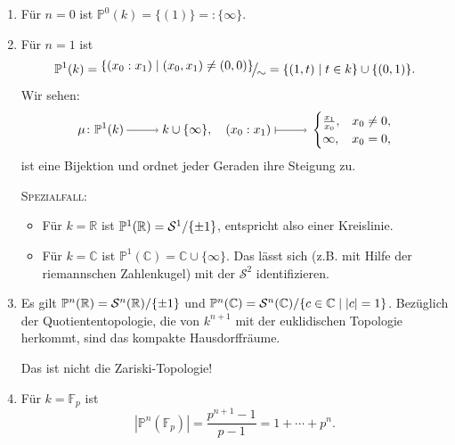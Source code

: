 \documentclass[a4paper,12pt]{scrbook}
\theoremstyle{keinenummern} %
\theoremstyle{mitnummern}
\theoremstyle{unserbeweis}
\def\C{\mathbb{C}}
\def\P{\mathbb{P}}
\def\S{\mathcal{S}}
\newcommand{\FF}{\mathbb{F}}
\newcommand{\card}[1]{|#1|}
\newcommand{\set}[1]{\ensuremath{\mathbb{#1}}}
\newcommand{\R}{\set{R}}
\newcommand{\ra}{\raisebox{-1pt}{\tikz{\draw[thin,shorten >=3pt, ->] (0,0) node{\hspace*{-2pt}} -- node{} (1,0);}}\penalty1000\relax}
\renewcommand{\mapsto}{\raisebox{-1pt}{\tikz{\draw[thin,shorten >=3pt, |->] (0,0) node{\hspace*{0pt}} -- node{} (1,0);}}\penalty1000\relax}
\newcommand{\Quotient}[2]{
  \mathchoice
  { %
    \raisebox{0.7ex}{\ensuremath{#1}}
    \ensuremath{\mkern-3mu}\big/\ensuremath{\mkern-3mu}
    \raisebox{-0.6ex}{\ensuremath{#2}}
  }
  { %
    #1/#2
  }
  { %
    #1/#2
  }
  { %
    #1/#2
  }
}
\begin{document}
\begin{bsp}\label{2.2.2}\begin{enumerate}
\item Für $n=0$ ist $\P^{0}(k) = \{(1)\} =: \{\infty\}$.
\item Für $n=1$ ist \[\P^{1}(k)=\Quotient{\{(x_{0}:x_{1})\mid(x_{0},x_{1})\neq(0,0)\}}{\sim}=\{(1,t)\mid t\in k\}\cup\{(0,1)\}.\] \vspace*{-6pt}Wir sehen:\vspace*{-12pt}
\[\mu\colon\P^{1}(k)\ra k\cup\{\infty\},\quad(x_{0}:x_{1})\mapsto\begin{cases}\frac{x_{1}}{x_{0}},&x_{0}\neq0,\\\infty,&x_{0}=0,\\\end{cases}\]
ist eine Bijektion und ordnet jeder Geraden ihre Steigung zu.

{\scshape Spezialfall:}\begin{itemize}\item Für $k=\R$ ist $\P^{1}(\R)=\Quotient{\S^{1}}{\{\pm1\}}$, entspricht also einer Kreislinie.
\item Für $k=\C$ ist $\P^{1}(\C)=\C\cup\{\infty\}$. Das lässt sich (z.B. mit Hilfe der riemannschen Zahlenkugel) mit der $\S^{2}$ identifizieren.
\end{itemize}
\item Es gilt $\P^{n}(\R)=\Quotient{\S^{n}(\R)}{\{\pm1\}}$ und $\P^{n}(\C)=\Quotient{\S^{n}(\C)}{\{c\in\C\mid |c|=1\}}$. Bezüglich der Quotiententopologie, die von $k^{n+1}$ mit der euklidischen Topologie herkommt, sind das kompakte Hausdorffräume.
\begin{w}Das ist nicht die Zariski-Topologie!\end{w}
\item Für $k=\FF_{p}$ ist
\[\card{\P^{n}(\FF_{p})}=\frac{p^{n+1}-1}{p-1}=1+\dotsm+p^{n}.\]
\end{enumerate}\end{bsp}
\end{document}
